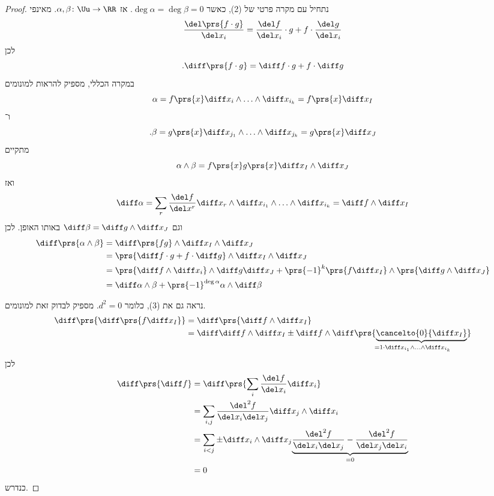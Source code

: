 \documentclass[a4paper,10pt,twoside,openany]{book}
\begin{document}
\begin{proof}
נתחיל עם מקרה פרטי של (2), כאשר
$\deg \alpha = \deg \beta = 0$.
אז
$\alpha,\beta \colon \Uu \to \RR$.
מאינפי
\[\frac{\del \prs{f \cdot g}}{\del x_i} = \frac{\del f}{\del x_i} \cdot g + f\cdot \frac{\del g}{\del x_i}\]
לכן
\[\text{.} \diff\prs{f \cdot g} = \diff f \cdot g + f \cdot \diff g\]
במקרה הכללי, מספיק להראות למונומים
\[\alpha = f\prs{x} \diff x_i \wedge \ldots \wedge \diff x_{i_k} = f\prs{x} \diff x_I\]
ו־%
\[\text{.} \beta = g\prs{x} \diff x_{j_1} \wedge \ldots \wedge \diff x_{j_k} = g\prs{x} \diff x_J\]
מתקיים
\[\alpha \wedge \beta = f\prs{x} g\prs{x} \diff x_I \wedge \diff x_J\]
ואז
\begin{align*}
\diff \alpha = \sum_r \frac{\del f}{\del x^r} \diff x_r \wedge \diff x_{i_1} \wedge \ldots \wedge \diff x_{i_k} = \diff f \wedge \diff x_I 
\end{align*}
וגם
$\diff \beta = \diff g \wedge \diff x_J$
באותו האופן.
לכן
\begin{align*}
\diff\prs{\alpha \wedge \beta} &= \diff \prs{fg} \wedge \diff x_I \wedge \diff x_J \\
&= \prs{\diff f \cdot g + f \cdot \diff g} \wedge \diff x_I \wedge \diff x_J \\
&= \prs{\diff f \wedge \diff x_i} \wedge \diff g \diff x_J + \prs{-1}^k \prs{f \diff x_I} \wedge \prs{\diff g \wedge \diff x_J} \\&=
\diff \alpha \wedge \beta + \prs{-1}^{\deg \alpha} \alpha \wedge \diff \beta 
\end{align*}

נראה גם את (3), כלומר
$d^2 = 0$.
מספיק לבדוק זאת למונומים.
\begin{align*}
\diff\prs{\diff \prs{f \diff x_I}} &= \diff\prs{\diff f \wedge \diff x_I} \\&=
\diff \diff f\wedge \diff x_I \pm \diff f \wedge \diff\underset{= 1 \cdot \diff x_{i_1} \wedge \ldots \wedge \diff x_{i_k}}{\prs{\underbrace{\cancelto{0}{\diff x_I}}}}
\end{align*}
לכן
\begin{align*}
\diff\prs{\diff f} &= \diff\prs{\sum_i \frac{\del f}{\del x_i} \diff x_i} \\&=
\sum_{i,j} \frac{\del^2 f}{\del x_i \del x_j} \diff x_j \wedge \diff x_i \\&=
\sum_{i < j} \pm \diff x_i \wedge \diff x_j \underset{=0}{\underbrace{\frac{\del^2 f}{\del x_i \del x_j} - \frac{\del^2 f}{\del x_j \del x_i}}} \\&= 0
\end{align*}
כנדרש.
\end{proof}
\end{document}
